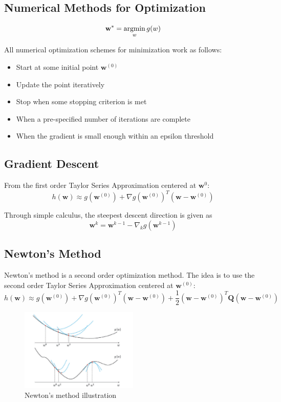 \documentclass[11pt]{article}
\begin{document}
\subsection{Numerical Methods for Optimization}

$$\textbf{w}^* = \operatorname*{argmin}_w g(w)$$

All numerical optimization schemes for minimization work as follows:
\begin{itemize}
  \item Start at some initial point $\textbf{w}^{(0)}$
  \item Update the point iteratively
  \item Stop when some stopping criterion is met
\end{itemize}

\begin{itemize}
  \item When a pre-specified number of iterations are complete
  \item When the gradient is small enough within an epsilon threshold
\end{itemize}

\subsection{Gradient Descent}

From the first order Taylor Series Approximation centered at $\textbf{w}^{0}$:
$$h(\textbf{w}) \approx g(\textbf{w}^{(0)}) + \nabla g(\textbf{w}^{(0)})^T(\textbf{w} - \textbf{w}^{(0)})$$

Through simple calculus, the steepest descent direction is given as 
$$\textbf{w}^k = \textbf{w}^{k-1}-\nabla_k g(\textbf{w}^{k-1})$$

\subsection{Newton's Method}

Newton's method is a second order optimization method. The idea is to use the second order Taylor Series Approximation centered at $\textbf{w}^{(0)}$:
$$h(\textbf{w}) \approx g(\textbf{w}^{(0)}) + \nabla g(\textbf{w}^{(0)})^T(\textbf{w} - \textbf{w}^{(0)}) + \frac{1}{2}(\textbf{w} - \textbf{w}^{(0)})^T\textbf{Q}(\textbf{w} - \textbf{w}^{(0)})$$

\begin{figure}[h]
\centering
\includegraphics[width=0.5\textwidth]{NewtonsMethod.png}
\caption{Newton's method illustration}
\label{fig:newtons-method}
\end{figure}
\end{document}

